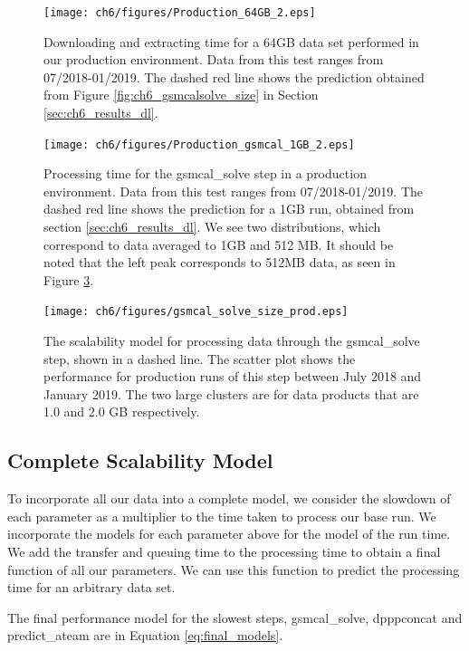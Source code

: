 \begin{figure}
    \texttt{[image: ch6/figures/Production\_64GB\_2.eps]}
      \caption{Downloading and extracting time for a 64GB data set performed in our production environment. Data from this test ranges from 07/2018-01/2019. The dashed red line shows the prediction obtained from Figure \ref{fig:ch6_gsmcalsolve_size} in Section \ref{sec:ch6_results_dl}. }
	\label{fig:ch6_prod_dl_64}
\end{figure}


\begin{figure}
    \texttt{[image: ch6/figures/Production\_gsmcal\_1GB\_2.eps]}
      \caption{Processing time for the {\selectfont gsmcal\_solve} step in a production environment. Data from this test ranges from 07/2018-01/2019. The dashed red line shows the prediction for a 1GB run, obtained from section \ref{sec:ch6_results_dl}. We see two distributions, which correspond to data averaged to 1GB and 512 MB.  It should be noted that the left peak corresponds to 512MB data, as seen in Figure \ref{fig:ch6_prod_gsmcal_times}.}
	\label{fig:ch6_prod_gsmcal}
\end{figure}


\begin{figure}
    \texttt{[image: ch6/figures/gsmcal\_solve\_size\_prod.eps]}
      \caption{The scalability model for processing data through the {\selectfont gsmcal\_solve} step, shown in a dashed line. The scatter plot shows the performance for production runs of this step between July 2018 and January 2019. The two large clusters are for data products that are 1.0 and 2.0 GB respectively. }
	\label{fig:ch6_prod_gsmcal_times}
\end{figure}


\subsection{Complete Scalability Model}
To incorporate all our data into a complete model, we consider the slowdown of each parameter as a multiplier to the time taken to process our base run. We incorporate the models for each parameter above for the model of the run time. We add the transfer and queuing time to the processing time to obtain a final function of all our parameters. We can use this function to predict the processing time for an arbitrary data set. 

The final performance model for the slowest steps, {\selectfont gsmcal\_solve}, {\selectfont dpppconcat}  and {\selectfont predict\_ateam} are in Equation \ref{eq:final_models}. 

